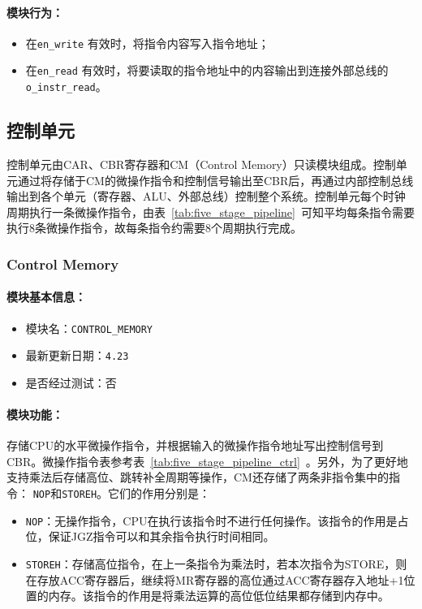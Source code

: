 \documentclass[lang=cn,a4paper,newtx]{elegantpaper}
\begin{document}
\paragraph{模块行为：}
\begin{itemize}
  \item 在\texttt{en\_write} 有效时，将指令内容写入指令地址；
  \item 在\texttt{en\_read} 有效时，将要读取的指令地址中的内容输出到连接外部总线的\texttt{o\_instr\_read}。
\end{itemize}


\subsection{控制单元}
控制单元由CAR、CBR寄存器和CM（Control Memory）只读模块组成。控制单元通过将存储于CM的微操作指令和控制信号输出至CBR后，再通过内部控制总线输出到各个单元（寄存器、ALU、外部总线）控制整个系统。控制单元每个时钟周期执行一条微操作指令，由表~\ref{tab:five_stage_pipeline}~可知平均每条指令需要执行8条微操作指令，故每条指令约需要8个周期执行完成。
\subsubsection{Control Memory}\label{sec:ControlMemory}
\paragraph{模块基本信息：}
\begin{itemize}
  \item 模块名：\texttt{CONTROL\_MEMORY}
  \item 最新更新日期：\texttt{4.23}
  \item 是否经过测试：否
\end{itemize}
\paragraph{模块功能：}
存储CPU的水平微操作指令，并根据输入的微操作指令地址写出控制信号到CBR。微操作指令表参考表~\ref{tab:five_stage_pipeline_ctrl}~。另外，为了更好地支持乘法后存储高位、跳转补全周期等操作，CM还存储了两条非指令集中的指令：
\texttt{NOP}和\texttt{STOREH}。它们的作用分别是：
\begin{itemize}
  \item \texttt{NOP}：无操作指令，CPU在执行该指令时不进行任何操作。该指令的作用是占位，保证JGZ指令可以和其余指令执行时间相同。
  \item \texttt{STOREH}：存储高位指令，在上一条指令为乘法时，若本次指令为STORE，则在存放ACC寄存器后，继续将MR寄存器的高位通过ACC寄存器存入地址+1位置的内存。该指令的作用是将乘法运算的高位低位结果都存储到内存中。
\end{itemize}
\end{document}

